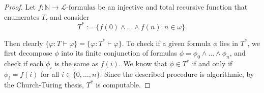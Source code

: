 \documentclass{article}
\begin{document}
\begin{enumerate}[label={\bf Q\arabic*:}]
    \begin{proof}
      Let $f:\mathbb{N}\rightarrow\mathcal{L}\text{-formulas}$ be an
      injective and total recursive function that enumerates $T$, and
      consider
      \[T^*:=\{f(0)\wedge\ldots\wedge f(n): n\in\omega\}.\]

      Then clearly $\{\varphi:T\vdash\varphi\}
      =\{\varphi:T^*\vdash\varphi\}$. To check if a given formula $\phi$
      lies in $T^*$, we first decompose $\phi$ into its finite conjunction
      of formulas $\phi=\phi_0\wedge\ldots\wedge\phi_n$, and check if each
      $\phi_i$ is the same as $f(i)$. We know that $\phi\in T^*$ if and
      only if $\phi_i=f(i)$ for all $i\in\{0,\ldots,n\}$. Since the
      described procedure is algorithmic, by the Church-Turing thesis,
      $T^*$ is computable.
    \end{proof}
\end{enumerate}
\end{document}
